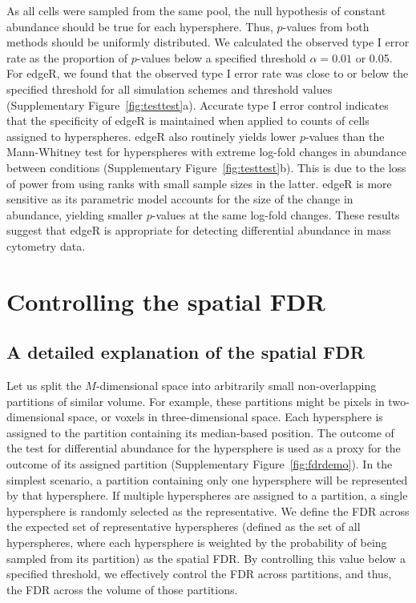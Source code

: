 \documentclass{article}
\begin{document}
As all cells were sampled from the same pool, the null hypothesis of constant abundance should be true for each hypersphere.
Thus, $p$-values from both methods should be uniformly distributed.
We calculated the observed type I error rate as the proportion of $p$-values below a specified threshold $\alpha=0.01$ or 0.05.
For edgeR, we found that the observed type I error rate was close to or below the specified threshold for all simulation schemes and threshold values (Supplementary Figure~\ref{fig:testtest}a).
Accurate type I error control indicates that the specificity of edgeR is maintained when applied to counts of cells assigned to hyperspheres.
edgeR also routinely yields lower $p$-values than the Mann-Whitney test for hyperspheres with extreme log-fold changes in abundance between conditions (Supplementary Figure~\ref{fig:testtest}b).
This is due to the loss of power from using ranks with small sample sizes in the latter.
edgeR is more sensitive as its parametric model accounts for the size of the change in abundance, yielding smaller $p$-values at the same log-fold changes.
These results suggest that edgeR is appropriate for detecting differential abundance in mass cytometry data.

\section{Controlling the spatial FDR}

\subsection{A detailed explanation of the spatial FDR}
\label{sec:fdr}
Let us split the $M$-dimensional space into arbitrarily small non-overlapping partitions of similar volume.
For example, these partitions might be pixels in two-dimensional space, or voxels in three-dimensional space.
Each hypersphere is assigned to the partition containing its median-based position.
The outcome of the test for differential abundance for the hypersphere is used as a proxy for the outcome of its assigned partition (Supplementary Figure~\ref{fig:fdrdemo}).
In the simplest scenario, a partition containing only one hypersphere will be represented by that hypersphere.
If multiple hyperspheres are assigned to a partition, a single hypersphere is randomly selected as the representative.
We define the FDR across the expected set of representative hyperspheres (defined as the set of all hyperspheres, where each hypersphere is weighted by the probability of being sampled from its partition) as the spatial FDR.
By controlling this value below a specified threshold, we effectively control the FDR across partitions, and thus, the FDR across the volume of those partitions.
\end{document}

